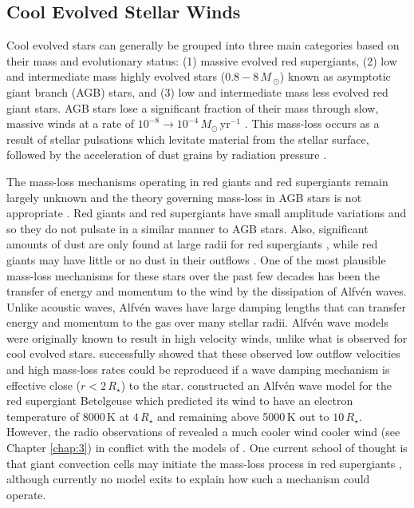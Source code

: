 \subsection{Cool Evolved Stellar Winds}\label{sec:1.4.3}
Cool evolved stars can generally be grouped into three main categories based on their mass and evolutionary status: (1) massive evolved red supergiants, (2) low and intermediate mass highly evolved stars ($0.8 - 8\,M\,_{\odot}$) known as asymptotic giant branch (AGB) stars, and (3) low and intermediate mass less evolved red giant stars. AGB stars lose a significant fraction of their mass through slow, massive winds at a rate of $10^{-8} \rightarrow 10^{-4}\,M_{\odot}$\,yr$^{-1}$ \citep{van_loon_2005}. This mass-loss occurs as a result of stellar pulsations \citep{habing_1996} which levitate material from the stellar surface, followed by the acceleration of dust grains by radiation pressure \citep{gehrz_1971}. 

The mass-loss mechanisms operating in red giants and red supergiants remain largely unknown and the theory governing mass-loss in AGB stars is not appropriate \citep{josselin_2007}. Red giants and red supergiants have small amplitude variations and so they do not pulsate in a similar manner to AGB stars. Also, significant amounts of dust are only found at large radii for red supergiants \citep{danchi_1994}, while red giants may have little or no dust in their outflows \citep{jones_2008}. One of the most plausible mass-loss mechanisms for these stars over the past few decades has been the transfer of energy and momentum to the wind by the dissipation of Alfv\'en waves. Unlike acoustic waves, Alfv\'en waves have large damping lengths that can transfer energy and momentum to the gas over many stellar radii. Alfv\'en wave models were originally known to result in high velocity winds, unlike what is observed for cool evolved stars. \cite{hartmann_1980} successfully showed that these observed low outflow velocities and high mass-loss rates could be reproduced if a wave damping mechanism is effective close ($r < 2\,R_{\star}$) to the star. \cite{hartmann_1984} constructed an Alfv\'en wave model for the red supergiant Betelgeuse which predicted its wind to have an electron temperature of 8000\,K at $4\,R_{\star}$ and remaining above 5000\,K out to $10\,R_{\star}$. However, the radio observations of \cite{lim_1998} revealed a much cooler wind cooler wind (see Chapter \ref{chap:3}) in conflict with the models of \cite{hartmann_1984}. One current school of thought is that giant convection cells may initiate the mass-loss process in red supergiants \cite[e.g.,][]{lim_1998}, although currently no model exits to explain how such a mechanism could operate.

